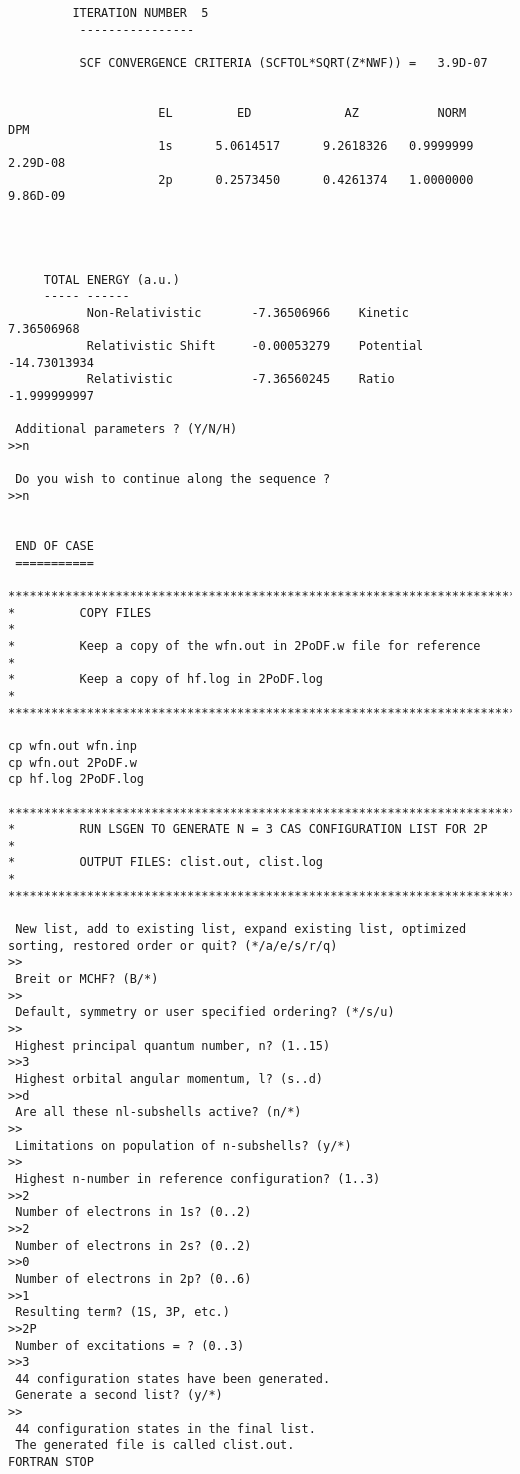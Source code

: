 \documentclass[fleqn,10pt]{book}
\begin{document}
\begin{verbatim}
         ITERATION NUMBER  5
          ----------------

          SCF CONVERGENCE CRITERIA (SCFTOL*SQRT(Z*NWF)) =   3.9D-07


                     EL         ED             AZ           NORM       DPM
                     1s      5.0614517      9.2618326   0.9999999    2.29D-08
                     2p      0.2573450      0.4261374   1.0000000    9.86D-09




     TOTAL ENERGY (a.u.)
     ----- ------
           Non-Relativistic       -7.36506966    Kinetic        7.36506968
           Relativistic Shift     -0.00053279    Potential    -14.73013934
           Relativistic           -7.36560245    Ratio        -1.999999997
 
 Additional parameters ? (Y/N/H)
>>n

 Do you wish to continue along the sequence ?
>>n


 END OF CASE
 ===========
 
*******************************************************************************
*         COPY FILES                                                          *
*         Keep a copy of the wfn.out in 2PoDF.w file for reference            *
*         Keep a copy of hf.log in 2PoDF.log                                  *
*******************************************************************************

cp wfn.out wfn.inp
cp wfn.out 2PoDF.w
cp hf.log 2PoDF.log

*******************************************************************************
*         RUN LSGEN TO GENERATE N = 3 CAS CONFIGURATION LIST FOR 2P           *
*         OUTPUT FILES: clist.out, clist.log                                  *
*******************************************************************************

 New list, add to existing list, expand existing list, optimized sorting, restored order or quit? (*/a/e/s/r/q)
>>
 Breit or MCHF? (B/*)
>>
 Default, symmetry or user specified ordering? (*/s/u)
>>
 Highest principal quantum number, n? (1..15)
>>3
 Highest orbital angular momentum, l? (s..d)
>>d
 Are all these nl-subshells active? (n/*)
>>
 Limitations on population of n-subshells? (y/*)
>>
 Highest n-number in reference configuration? (1..3)
>>2
 Number of electrons in 1s? (0..2)
>>2
 Number of electrons in 2s? (0..2)
>>0
 Number of electrons in 2p? (0..6)
>>1
 Resulting term? (1S, 3P, etc.)
>>2P
 Number of excitations = ? (0..3)
>>3
 44 configuration states have been generated.
 Generate a second list? (y/*)
>>
 44 configuration states in the final list.
 The generated file is called clist.out.
FORTRAN STOP


\end{verbatim}
\end{document}
